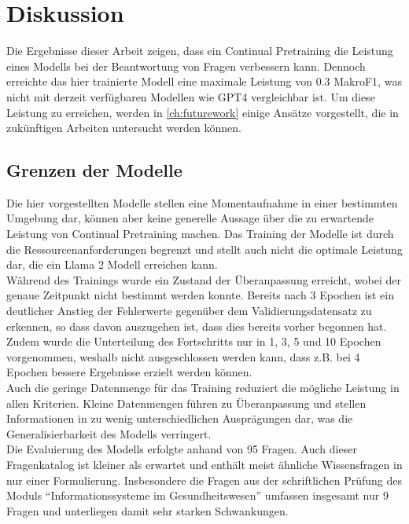 \chapter{Diskussion}\label{ch:discussion}
Die Ergebnisse dieser Arbeit zeigen, dass ein Continual Pretraining die Leistung eines Modells bei der Beantwortung von Fragen verbessern kann.
Dennoch erreichte das hier trainierte Modell eine maximale Leistung von \num{0.3} MakroF1, was nicht mit derzeit verfügbaren Modellen wie GPT4 vergleichbar ist.
Um diese Leistung zu erreichen, werden in \cref{ch:futurework} einige Ansätze vorgestellt, die in zukünftigen Arbeiten untersucht werden können.

\section{Grenzen der Modelle}
Die hier vorgestellten Modelle stellen eine Momentaufnahme in einer bestimmten Umgebung dar, können aber keine generelle Aussage über die zu erwartende Leistung von Continual Pretraining machen.
Das Training der Modelle ist durch die Ressourcenanforderungen begrenzt und stellt auch nicht die optimale Leistung dar, die ein Llama 2 Modell erreichen kann.\\

Während des Trainings wurde ein Zustand der Überanpassung erreicht, wobei der genaue Zeitpunkt nicht bestimmt werden konnte.
Bereits nach 3 Epochen ist ein deutlicher Anstieg der Fehlerwerte gegenüber dem Validierungsdatensatz zu erkennen, so dass davon auszugehen ist, dass dies bereits vorher begonnen hat.
Zudem wurde die Unterteilung des Fortschritts nur in 1, 3, 5 und 10 Epochen vorgenommen, weshalb nicht ausgeschlossen werden kann, dass z.B. bei 4 Epochen bessere Ergebnisse erzielt werden können.\\

Auch die geringe Datenmenge für das Training reduziert die mögliche Leistung in allen Kriterien.
Kleine Datenmengen führen zu Überanpassung und stellen Informationen in zu wenig unterschiedlichen Ausprägungen dar, was die Generalisierbarkeit des Modells verringert.\\

Die Evaluierung des Modells erfolgte anhand von \num{95} Fragen.
Auch dieser Fragenkatalog ist kleiner als erwartet und enthält meist ähnliche Wissensfragen in nur einer Formulierung.
Insbesondere die Fragen aus der schriftlichen Prüfung des Moduls \enquote{Informationssysteme im Gesundheitswesen} umfassen insgesamt nur 9 Fragen und unterliegen damit sehr starken Schwankungen.\\


